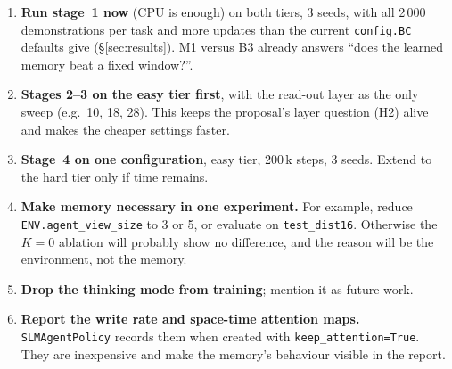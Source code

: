 \documentclass[11pt,a4paper]{article}
\newcommand{\code}[1]{\texttt{\small #1}}
\begin{document}
\begin{enumerate}
  \item \textbf{Run stage~1 now} (CPU is enough) on both tiers, 3 seeds, with all 2\,000 demonstrations per task and
  more updates than the current \code{config.BC} defaults give (\S\ref{sec:results}). M1 versus B3 already answers ``does the learned
  memory beat a fixed window?''.
  \item \textbf{Stages 2--3 on the easy tier first}, with the read-out layer as the only sweep (e.g.\ 10, 18, 28). This
  keeps the proposal's layer question (H2) alive and makes the cheaper settings faster.
  \item \textbf{Stage~4 on one configuration}, easy tier, 200\,k steps, 3 seeds. Extend to the hard tier only if time remains.
  \item \textbf{Make memory necessary in one experiment.} For example, reduce \code{ENV.agent\_view\_size} to 3 or 5,
  or evaluate on \code{test\_dist16}. Otherwise the $K{=}0$ ablation will probably show no difference, and the reason
  will be the environment, not the memory.
  \item \textbf{Drop the thinking mode from training}; mention it as future work.
  \item \textbf{Report the write rate and space-time attention maps.} \code{SLMAgentPolicy} records them when
  created with \code{keep\_attention=True}. They are inexpensive and make the memory's behaviour visible in the report.
\end{enumerate}
\end{document}
